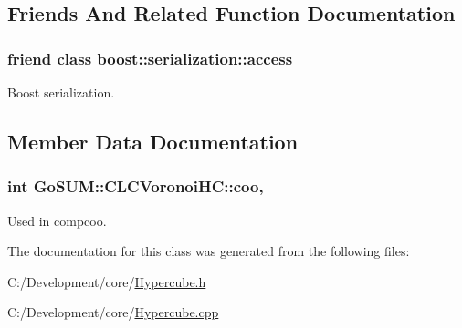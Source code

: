 \subsection{Friends And Related Function Documentation}
\hypertarget{class_go_s_u_m_1_1_c_l_c_voronoi_h_c_ac98d07dd8f7b70e16ccb9a01abf56b9c}{
\subsubsection[{boost\-::serialization\-::access}]{\setlength{\rightskip}{0pt plus 5cm}friend class boost\-::serialization\-::access\hspace{0.3cm}{\ttfamily [friend]}}}\label{class_go_s_u_m_1_1_c_l_c_voronoi_h_c_ac98d07dd8f7b70e16ccb9a01abf56b9c}


Boost serialization. 



\subsection{Member Data Documentation}
\hypertarget{class_go_s_u_m_1_1_c_l_c_voronoi_h_c_ad5ec0a5f8490d9de0998266c69ff9ab1}{
\subsubsection[{coo}]{\setlength{\rightskip}{0pt plus 5cm}int Go\-S\-U\-M\-::\-C\-L\-C\-Voronoi\-H\-C\-::coo\hspace{0.3cm}{\ttfamily [static]}, {\ttfamily [protected]}}}\label{class_go_s_u_m_1_1_c_l_c_voronoi_h_c_ad5ec0a5f8490d9de0998266c69ff9ab1}


Used in compcoo. 



The documentation for this class was generated from the following files\-:\begin{DoxyCompactItemize}
\item 
C\-:/\-Development/core/\hyperlink{_hypercube_8h}{Hypercube.\-h}\item 
C\-:/\-Development/core/\hyperlink{_hypercube_8cpp}{Hypercube.\-cpp}\end{DoxyCompactItemize}

